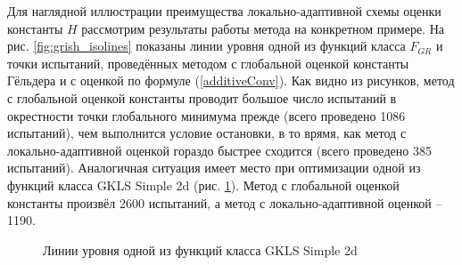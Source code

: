 Для наглядной иллюстрации преимущества локально-адаптивной схемы оценки константы
\(H\) рассмотрим результаты работы метода на конкретном примере. На рис. \ref{fig:grish_isolines} показаны
линии уровня одной из функций класса \(F_{GR}\) и точки испытаний, проведённых методом с глобальной
оценкой константы Гёльдера и с оценкой по формуле (\ref{additiveConv}). Как видно из рисунков, метод с
глобальной оценкой константы проводит большое число испытаний в окрестности точки
глобального минимума прежде (всего проведено 1086 испытаний), чем выполнится условие
остановки, в то врямя, как метод с локально-адаптивной оценкой гораздо быстрее
сходится (всего проведено 385 испытаний). Аналогичная ситуация имеет место при
оптимизации одной из функций класса GKLS Simple 2d (рис. \ref{fig:gkls_isolines}). Метод с глобальной
оценкой константы произвёл 2600 испытаний, а метод с локально-адаптивной оценкой – 1190.

\begin{figure}[ht]
    \centering
    \qquad
    \caption{Линии уровня одной из функций класса GKLS Simple 2d}
    \label{fig:gkls_isolines}
\end{figure}

